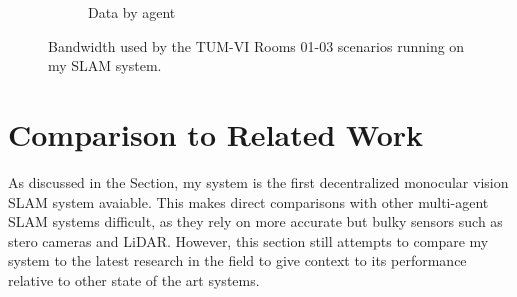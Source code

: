 \begin{figure}[h]
\begin{subfigure}[b]{0.45\linewidth}
        \caption{Data by agent}
    \end{subfigure}%

    \caption{Bandwidth used by the TUM-VI Rooms 01-03 scenarios running on my SLAM system.}
    \label{fig:tum-rooms-01-03-bandwith}
\end{figure}


\section{Comparison to Related Work}
\label{sec:comparison-to-related-work}

As discussed in the  Section, my system is the first decentralized monocular vision SLAM system avaiable. This makes direct comparisons with other multi-agent SLAM systems difficult, as they rely on more accurate but bulky sensors such as stero cameras and LiDAR. However, this section still attempts to compare my system to the latest research in the field to give context to its performance relative to other state of the art systems.

